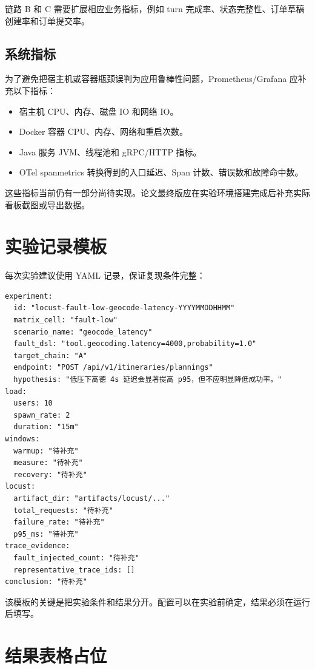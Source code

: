 链路 B 和 C 需要扩展相应业务指标，例如 turn 完成率、状态完整性、订单草稿创建率和订单提交率。

\subsection{系统指标}

为了避免把宿主机或容器瓶颈误判为应用鲁棒性问题，Prometheus/Grafana 应补充以下指标：

\begin{itemize}
  \item 宿主机 CPU、内存、磁盘 IO 和网络 IO。
  \item Docker 容器 CPU、内存、网络和重启次数。
  \item Java 服务 JVM、线程池和 gRPC/HTTP 指标。
  \item OTel spanmetrics 转换得到的入口延迟、Span 计数、错误数和故障命中数。
\end{itemize}

这些指标当前仍有一部分尚待实现。论文最终版应在实验环境搭建完成后补充实际看板截图或导出数据。

\section{实验记录模板}

每次实验建议使用 YAML 记录，保证复现条件完整：

\begin{verbatim}
experiment:
  id: "locust-fault-low-geocode-latency-YYYYMMDDHHMM"
  matrix_cell: "fault-low"
  scenario_name: "geocode_latency"
  fault_dsl: "tool.geocoding.latency=4000,probability=1.0"
  target_chain: "A"
  endpoint: "POST /api/v1/itineraries/plannings"
  hypothesis: "低压下高德 4s 延迟会显著提高 p95，但不应明显降低成功率。"
load:
  users: 10
  spawn_rate: 2
  duration: "15m"
windows:
  warmup: "待补充"
  measure: "待补充"
  recovery: "待补充"
locust:
  artifact_dir: "artifacts/locust/..."
  total_requests: "待补充"
  failure_rate: "待补充"
  p95_ms: "待补充"
trace_evidence:
  fault_injected_count: "待补充"
  representative_trace_ids: []
conclusion: "待补充"
\end{verbatim}

该模板的关键是把实验条件和结果分开。配置可以在实验前确定，结果必须在运行后填写。

\section{结果表格占位}

